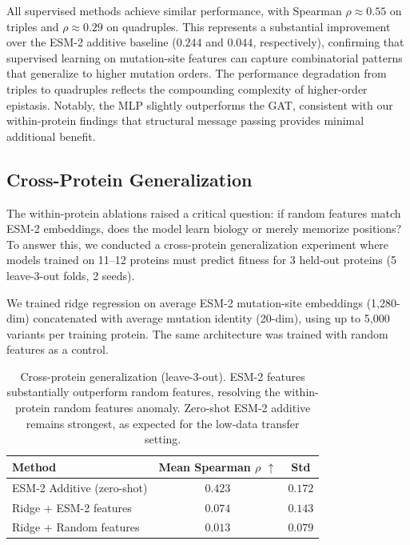 \documentclass{article}
\newcommand{\spearman}{\rho}
\begin{document}
All supervised methods achieve similar performance, with Spearman $\rho \approx 0.55$ on triples and $\rho \approx 0.29$ on quadruples. This represents a substantial improvement over the ESM-2 additive baseline ($0.244$ and $0.044$, respectively), confirming that supervised learning on mutation-site features can capture combinatorial patterns that generalize to higher mutation orders. The performance degradation from triples to quadruples reflects the compounding complexity of higher-order epistasis. Notably, the MLP slightly outperforms the GAT, consistent with our within-protein findings that structural message passing provides minimal additional benefit.

\subsection{Cross-Protein Generalization}
\label{sec:cross_protein}

The within-protein ablations raised a critical question: if random features match ESM-2 embeddings, does the model learn biology or merely memorize positions? To answer this, we conducted a cross-protein generalization experiment where models trained on 11--12 proteins must predict fitness for 3 held-out proteins (5 leave-3-out folds, 2 seeds).

We trained ridge regression on average ESM-2 mutation-site embeddings (1{,}280-dim) concatenated with average mutation identity (20-dim), using up to 5{,}000 variants per training protein. The same architecture was trained with random features as a control.

\begin{table}[t]
\caption{Cross-protein generalization (leave-3-out). ESM-2 features substantially outperform random features, resolving the within-protein random features anomaly. Zero-shot ESM-2 additive remains strongest, as expected for the low-data transfer setting.}
\label{tab:cross_protein}
\centering
\begin{tabular}{lcc}
\toprule
Method & Mean Spearman $\spearman$ $\uparrow$ & Std \\
\midrule
ESM-2 Additive (zero-shot) & $\mathbf{0.423}$ & $0.172$ \\
Ridge + ESM-2 features & $0.074$ & $0.143$ \\
Ridge + Random features & $0.013$ & $0.079$ \\
\bottomrule
\end{tabular}
\end{table}
\end{document}
